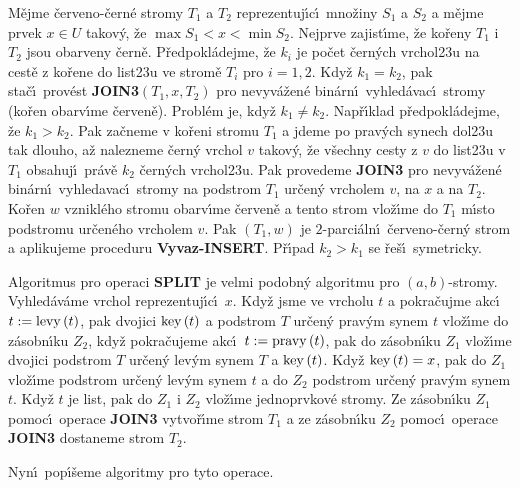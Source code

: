 \flushpar M\v ejme \v cerveno-\v cern\'e stromy $T_1$ a $T_2$ reprezentuj\'\i c\'\i\ 
mno\v ziny $S_1$ a $S_2$ a m\v ejme prvek $x\in U$ takov\'y, \v ze 
$\max S_1<x<\min S_2$.  Nejprve zajist\'\i me, \v ze ko\v reny $T_
1$ i $T_2$ jsou 
obarveny \v cern\v e.  P\v redpokl\'adejme, \v ze $k_i$ je po\v cet \v cern\'ych 
vrchol\accent23u na cest\v e z ko\v rene do list\accent23u ve strom\v e 
$T_i$ pro $i=1,2$.  Kdy\v z $k_1=k_2$, pak sta\v c\'\i\ prov\'est {\bf JOIN3$
\left(T_1,x,T_2\right)$ }
pro nevyv\'a\v zen\'e bin\'arn\'\i\ vyhled\'avac\'\i\ stromy (ko\v ren obarv\'\i me 
\v cerven\v e).  Probl\'em je, kdy\v z $k_1\ne k_2$.  Nap\v r\'\i klad 
p\v redpokl\'adejme, \v ze $k_1>k_2$.  Pak za\v cneme v ko\v reni stromu $
T_1$ a 
jdeme po prav\'ych synech dol\accent23u tak dlouho, a\v z nalezneme 
\v cern\'y vrchol $v$ takov\'y, \v ze v\v sechny cesty z $v$ do list\accent23u 
v $T_1$ obsahuj\'\i\ pr\'av\v e $k_2$ \v cern\'ych vrchol\accent23u.  Pak 
provedeme {\bf JOIN3} pro nevyv\'a\v zen\'e bin\'arn\'\i\ vyhledavac\'\i\ stromy 
na podstrom $T_1$ ur\v cen\'y vrcholem $v$, na $x$ a na $T_2$. Ko\v ren $
w$ 
vznikl\'eho stromu obarv\'\i me \v cerven\v e a tento strom vlo\v z\'\i me do 
$T_1$ m\'\i sto podstromu ur\v cen\'eho vrcholem $v$. Pak $\left(T_1,w
\right)$ je 
$2$-parci\'aln\'\i\ \v cerveno-\v cern\'y strom a aplikujeme proceduru 
{\bf Vyvaz-INSERT}. P\v r\'\i pad $k_2>k_1$ se \v re\v s\'\i\ symetricky. 
\medskip

\flushpar Algoritmus pro operaci {\bf SPLIT} je velmi podobn\'y 
algoritmu pro $\left(a,b\right)$-stromy. Vy\-hled\'av\'a\-me vrchol 
reprezentuj\'\i c\'\i\ $x$. Kdy\v z jsme ve vrcholu $t$ a pokra\v cujme akc\'\i\ 
$t:=\operatorname{levy}\left(t\right)$, pak dvojici $\operatorname{key}\left(t\right)$ a podstrom $T$ ur\v cen\'y prav\'ym 
synem $t$ vlo\v z\'\i me do z\'asobn\'\i ku $Z_2$, kdy\v z pokra\v cujeme akc\'\i\ 
$t:=\operatorname{pravy}\left(t\right)$, pak do z\'asobn\'\i ku $Z_1$ vlo\v z\'\i me dvojici podstrom $
T$ 
ur\v cen\'y lev\'ym synem $T$ a $\operatorname{key}\left(t\right)$. Kdy\v z $\operatorname{key}\left(t\right)=x$, pak do $
Z_1$ 
vlo\v z\'\i me podstrom ur\v cen\'y lev\'ym synem $t$ a do $Z_2$ podstrom 
ur\v cen\'y prav\'ym synem $t$. Kdy\v z $t$ je list, pak do $Z_1$ i $
Z_2$ vlo\v z\'\i me 
jednoprvkov\'e stromy. Ze z\'asobn\'\i ku $Z_1$ pomoc\'\i\ operace {\bf JOIN3 }
vytvo\v r\'\i me strom $T_1$ a ze z\'asobn\'\i ku $Z_2$ pomoc\'\i\ operace {\bf JOIN3 }
dostaneme strom $T_2$. 
\medskip

\flushpar Nyn\'\i\ pop\'\i\v seme algoritmy pro tyto operace.
\medskip

